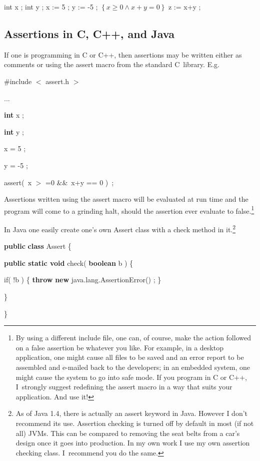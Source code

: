 \documentclass[muchmore,11pt]{article}%
\begin{document}
\begin{code}
int x ; int y ; x := 5 ; y := -5 ; $\left\{  x\geq0\wedge x+y=0\right\}  $ z
:= x+y ;
\end{code}

\subsection{Assertions in C, C++, and Java}

If one is programming in C or C++, then assertions may be written either as
comments or using the assert macro from the standard C\ library. E.g.

\begin{code}
\#include
$<$%
assert.h%
$>$%


...

\textbf{int} x ;

\textbf{int} y ;

x = 5 ;

y = -5 ;

assert(\ x
$>$%
=0 \&\&\ x+y == 0 )\ ;
\end{code}

\noindent Assertions written using the \textsf{assert} macro will be evaluated
at run time and the program will come to a grinding halt, should the assertion
ever evaluate to false.\footnote{By using a different include file, one can,
of course, make the action followed on a false assertion be whatever you like.
For example, in a desktop application, one might cause all files to be saved
and an error report to be assembled and e-mailed back to the developers; in an
embedded system, one might cause the system to go into safe mode. If you
program in C or C++, I\ strongly suggest redefining the assert macro in a way
that suits your application. And use it!}

In Java one easily create one's own \textsf{Assert} class with a
\textsf{check} method in it.\footnote{As of Java 1.4, there is actually an
\textsf{assert} keyword in Java. However I don't recommend its use. Assertion
checking is turned off by default in most (if not all) JVMs. This can be
compared to removing the seat belts from a car's design once it goes into
production. In my own work I use my own assertion checking class. I\ recommend
you do the same.}

\begin{code}
\textbf{public} \textbf{class} Assert \{

\begin{indent}
\item \textbf{public static void} check( \textbf{boolean} b ) \{

\begin{indent}
\item if( !b ) \{ \textbf{throw} \textbf{new} java.lang.AssertionError() ; \}
\end{indent}

\item \}
\end{indent}

\}
\end{code}
\end{document}
